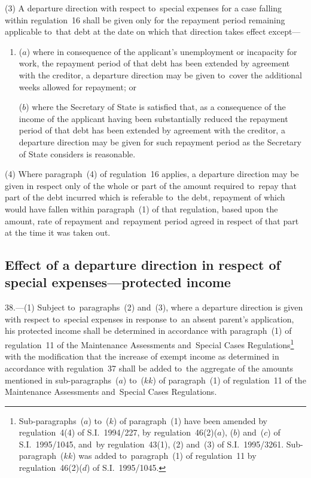 \documentclass[12pt,a4paper]{article}
\begin{document}
(3) A departure direction with respect to~special expenses for a case falling
within regulation~16 shall be given only for the repayment period remaining
applicable to~that debt at the date on which that direction takes effect except—
\begin{enumerate}\item[]
($a$) where in consequence of the applicant’s unemployment or incapacity for work,
the repayment period of that debt has been extended by agreement with the
creditor, a departure direction may be given to~cover the additional weeks
allowed for repayment; or

($b$) where the Secretary of State is satisfied that, as a consequence of the
income of the applicant having been substantially reduced the repayment period
of that debt has been extended by agreement with the creditor, a departure
direction may be given for such repayment period as the Secretary of State
considers is reasonable.
\end{enumerate}

(4) Where paragraph~(4) of regulation~16 applies, a departure direction may be given in respect only of 
the whole or part of the amount required to~repay  %
that part of the debt incurred which is referable to~the debt, repayment of which would have fallen within paragraph~(1) of that regulation, based upon the amount, rate of repayment and~repayment period agreed in respect of that part at the time it was taken out.


\subsection[38. Effect of a departure direction in respect of special expenses—\hspace{0pt}protected
income]{\sloppy Effect of a departure direction in respect of special expenses—\hspace{0pt}protected
income}

38.—(1) Subject to~paragraphs~(2) and~(3), where a departure direction is
given with respect to~special expenses in response to~an absent parent’s
application, his protected income shall be determined in accordance with
paragraph~(1) of regulation~11 of the Maintenance Assessments and~Special Cases
Regulations\footnote{\frenchspacing Sub-paragraphs~($a$) to~($k$) of paragraph~(1) have been amended by regulation~4(4) of S.I.~1994/227, by regulation~46(2)($a$), ($b$) and~($c$) of S.I.~1995/1045, and~by regulation~43(1), (2) and~(3) of S.I.~1995/3261. Sub-paragraph~($kk$) was added to~paragraph~(1) of regulation~11 by regulation~46(2)($d$) of S.I.~1995/1045.} with the modification that the increase of exempt income as
determined in accordance with regulation~37 shall be added to~the aggregate of
the amounts mentioned in sub-paragraphs~($a$) to~($kk$) of paragraph~(1) of
regulation~11 of the Maintenance Assessments and~Special Cases Regulations.
\end{document}
